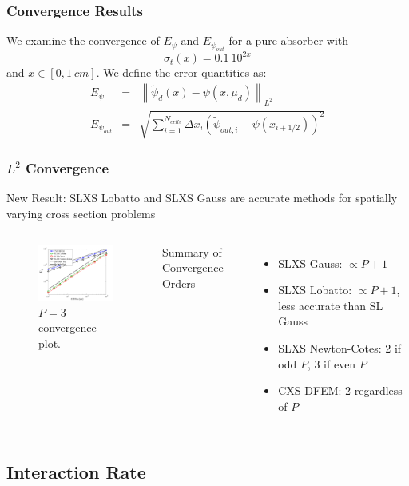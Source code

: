 \documentclass{beamer}
\newcommand{\be}{\begin{equation*}}   %
\newcommand{\ee}{\end{equation*}}
\newcommand{\bea}{\begin{eqnarray*}}  %
\newcommand{\eea}{\end{eqnarray*}}
\newcommand{\norm}[1]{\ensuremath{\left\lVert #1 \right\rVert}}  %
\begin{document}
\begin{frame}
\frametitle{Convergence Results}
We examine the convergence of $E_{\psi}$ and $E_{\psi_{out}}$ for a pure absorber with
\be
\sigma_t(x) = 0.1~10^{2x}
\ee
and $x\in[0,1~cm]$.  We define the error quantities as:
\bea
E_{\psi} &=& \norm{ \widetilde{\psi}_d(x) - \psi(x,\mu_d)  }_{L^2} \\
E_{\psi_{out}} &=& \sqrt{\sum_{i=1}^{N_{cells}}{\Delta x_i\left(\widetilde{\psi}_{out,i} - \psi(x_{i+1/2})  \right)^2   }}  
\eea
\end{frame}

\begin{frame}
\frametitle{$L^2$ Convergence}
New Result: SLXS Lobatto and SLXS Gauss are accurate methods for spatially varying cross section problems
\begin{columns}[c]
\begin{figure}
\includegraphics[width=5cm]{../chapter3_variable_xs/P3_VarXS_E_psi_L2.png}
\caption{$P=3$ convergence plot.}
\end{figure}
Summary of Convergence Orders
\begin{itemize}
\item SLXS Gauss: $\propto P+1$
\item SLXS Lobatto: $\propto P+1$, less accurate than SL Gauss
\item SLXS Newton-Cotes: 2 if odd $P$, 3 if even $P$
\item CXS DFEM: 2 regardless of $P$
\end{itemize}
\end{columns}
\end{frame}

\subsection{Interaction Rate}
\end{document}
